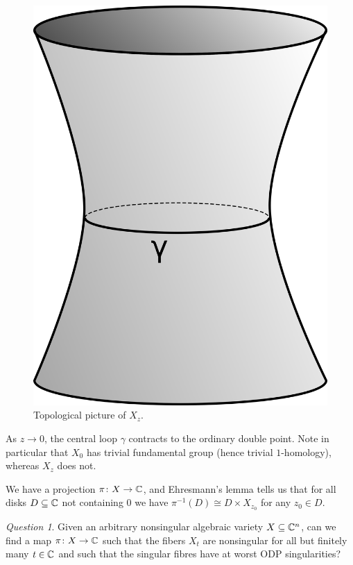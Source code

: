\documentclass[A4paper, british, reqno]{amsart}
\theoremstyle{darkgreentheorem}
\theoremstyle{darkbluedefinition}
\theoremstyle{darkredexample}
\theoremstyle{remark}
\newtheorem{q}[thm]{Question}
\newcommand{\1}{\mathbbm{1}}
\begin{document}
\begin{figure}[h]
    \centering
    \includegraphics[scale=.8]{smoothfiber}
    \caption{Topological picture of $X_{z}$.}
    \label{fig:smoothfibre}
\end{figure}

As $z\to 0$, the central loop $\gamma$ contracts to the ordinary double point.
Note in particular that $X_{0}$ has trivial fundamental group (hence trivial $1$-homology), whereas $X_{z}$ does not.

We have a projection $\pi\colon X\to \mathbb{C}$, and Ehresmann's lemma tells us that for all disks $D\subseteq \mathbb{C}$ not containing $0$ we have $\pi^{-1}(D)\cong D\times X_{z_{0}}$ for any $z_{0}\in D$.

\begin{q}
    Given an arbitrary nonsingular algebraic variety $X\subseteq \mathbb{C}^{n}$, can we find a map $\pi\colon X\to \mathbb{C}$ such that the fibers $X_{t}$ are nonsingular for all but finitely many $t\in \mathbb{C}$ and such that the singular fibres have at worst ODP singularities?
\end{q}
\end{document}
